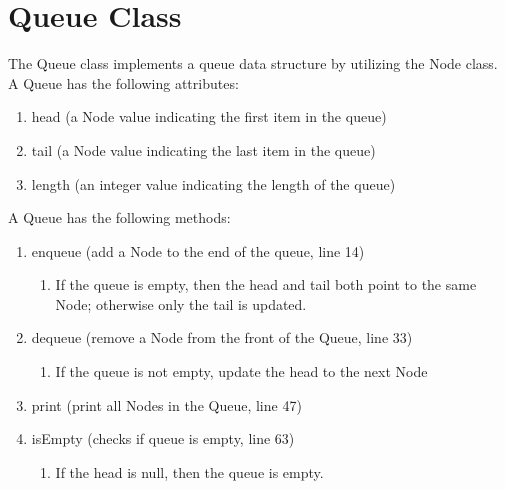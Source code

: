 \documentclass[letterpaper, 10pt,DIV=13]{scrartcl}
\numberwithin{equation}{section} %
\numberwithin{figure}{section} %
\numberwithin{table}{section} %
\begin{document}
\section{Queue Class}
The Queue class implements a queue data structure by utilizing the Node class. A Queue has the following attributes:
\begin{enumerate}
    \item head (a Node value indicating the first item in the queue)
    \item tail (a Node value indicating the last item in the queue)
    \item length (an integer value indicating the length of the queue)
\end{enumerate}

A Queue has the following methods: 
\begin{enumerate}
    \item enqueue (add a Node to the end of the queue, line 14) 
        \begin{enumerate}
            \item If the queue is empty, then the head and tail both point to the same Node; otherwise only the tail is updated.
        \end{enumerate}
    \item dequeue (remove a Node from the front of the Queue, line 33)
        \begin{enumerate}
            \item If the queue is not empty, update the head to the next Node
        \end{enumerate}
    \item print (print all Nodes in the Queue, line 47)
    \item isEmpty (checks if queue is empty, line 63)
        \begin{enumerate}
            \item If the head is null, then the queue is empty.
        \end{enumerate}
\end{enumerate}
\end{document}
